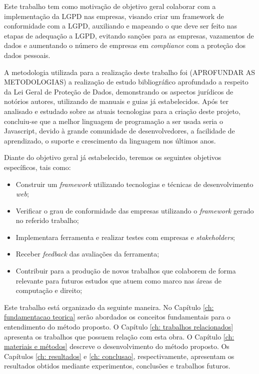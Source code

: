 \documentclass[
	12pt,				%
	openright,			%
	oneside,			%
	a4paper,			%
	english,			%
	french,				%
	spanish,			%
	brazil,				%
	]{abntex2}
\begin{document}
Este trabalho tem como motivação de objetivo geral colaborar com a implementação da LGPD nas empresas, visando criar um framework de conformidade com a LGPD, auxiliando e mapeando o que deve ser feito nas etapas de adequação a LGPD, evitando sanções para as empresas, vazamentos de dados e aumentando o número de empresas em \textit{compliance} com a proteção dos dados pessoais.


A metodologia utilizada para a realização deste trabalho foi (APROFUNDAR AS METODOLOGIAS) a realização de estudo bibliográfico aprofundado a respeito da Lei Geral de Proteção de Dados, demonstrando os aspectos jurídicos de notórios autores, utilizando de manuais e guias já estabelecidos. Após ter analisado e estudado sobre as atuais tecnologias para a criação deste projeto, concluiu-se que a melhor linguagem de programação a ser usada seria o Javascript, devido à grande comunidade de desenvolvedores, a facilidade de aprendizado, o suporte e crescimento da linguagem nos últimos anos.


Diante do objetivo geral já estabelecido, teremos os seguintes objetivos específicos, tais como:
\begin{itemize}
\item Construir um \textit{framework} utilizando tecnologias e técnicas de desenvolvimento \textit{web};
\item Verificar o grau de conformidade das empresas utilizando o \textit{framework} gerado no referido trabalho;
\item Implementara ferramenta e realizar testes com empresas e \textit{stakeholders};
\item Receber \textit{feedback} das avaliações da ferramenta;
\item Contribuir para a produção de novos trabalhos que colaborem de forma relevante para futuros estudos que atuem como marco nas áreas de computação e direito;
\end{itemize}



Este trabalho está organizado da seguinte maneira. No Capítulo \ref{ch: fundamentacao teorica} serão abordados os conceitos fundamentais para o entendimento do método proposto. O Capítulo \ref{ch: trabalhos relacionados} apresenta os trabalhos que possuem relação com esta obra. O Capítulo \ref{ch: materiais e métodos} descreve o desenvolvimento do método proposto. Os Capítulos \ref{ch: resultados} e \ref{ch: conclusao}, respectivamente, apresentam os resultados obtidos mediante experimentos, conclusões e trabalhos futuros.
\end{document}
